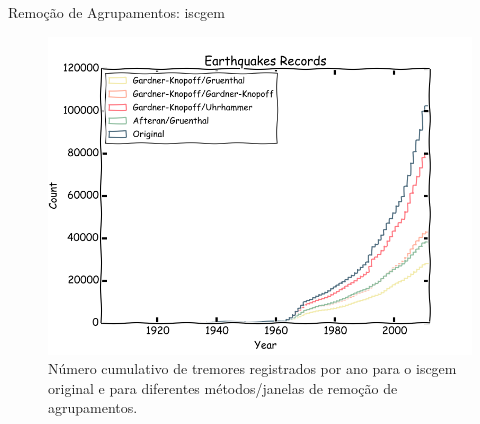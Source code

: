 \documentclass[ucs,8pt]{beamer}
\begin{document}
\begin{frame}{Remoção de Agrupamentos: \gls{iscgem}}
\begin{figure}[H]
	\centering
	\includegraphics[height=0.90\textheight]{decluster_sa}
	\caption{Número cumulativo de tremores registrados por ano para o \gls{iscgem}
	original e para diferentes métodos/janelas de remoção de agrupamentos.}
	\label{fig:sa_eq_record}
	\end{figure}%
\end{frame}
\end{document}
